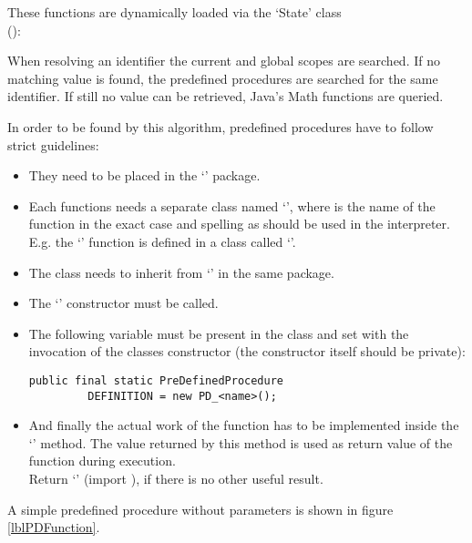 These functions are dynamically loaded via the `State' class\\ ():

When resolving an identifier the current and global scopes are searched. If no matching value is found, the predefined procedures are searched for the same identifier. If still no value can be retrieved, Java's Math functions are queried.

In order to be found by this algorithm, predefined procedures have to follow strict guidelines:

\begin{itemize}
	\item They need to be placed in the `' package.
	\item Each functions needs a separate class named `', where  is the name of the function in the exact case and spelling as should be used in the interpreter.\\
		E.g. the `' function is defined in a class called `'.
	\item The class needs to inherit from `' in the same package.
	\item The `' constructor must be called.
	\item The following variable must be present in the class and set with the invocation of the classes constructor (the constructor itself should be private):
\begin{lstlisting}[frame=none,numbers=none]
public final static PreDefinedProcedure
         DEFINITION = new PD_<name>();
\end{lstlisting}
	\item And finally the actual work of the function has to be implemented inside the `' method. The value returned by this method is used as return value of the function during execution.\\
	Return `' (import ), if there is no other useful result.

\end{itemize}

A simple predefined procedure without parameters is shown in figure \ref{lblPDFunction}.


